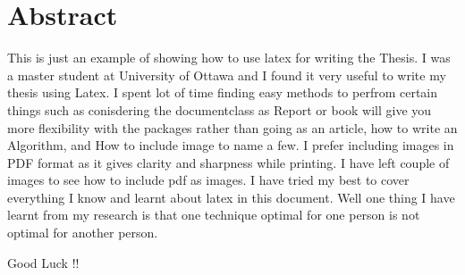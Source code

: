 \documentclass[12pt,english,oneside,letterpaper]{report}
\begin{document}
\chapter*{Abstract}
\setcounter{page}{1}
This is just an example of showing how to use latex for writing the Thesis. I was a master student at University of Ottawa and I found it very useful to write my thesis using Latex. I spent lot of time finding easy methods to perfrom certain things such as conisdering the documentclass as Report or book will give you more flexibility with the packages rather than going as an article, how to write an Algorithm, and How to include image to name a few. I prefer including images in PDF format as it gives clarity and sharpness while printing. I have left couple of images to see how to include pdf as images. I have tried my best to cover everything I know and learnt about latex in this document. Well one thing I have learnt from my research is that one technique optimal for one person is not optimal for another person.\par
Good Luck !! \par
\end{document}
